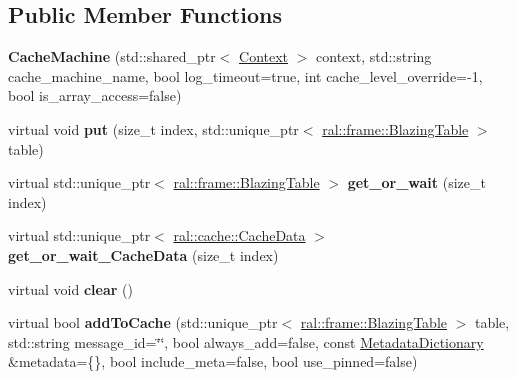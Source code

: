 \subsection*{Public Member Functions}
\begin{DoxyCompactItemize}
\item 
\mbox{\label{classral_1_1cache_1_1CacheMachine_a56079d9ace98b5755643a9f9d6f05e88}} 
{\bfseries Cache\+Machine} (std\+::shared\+\_\+ptr$<$ \hyperlink{classblazingdb_1_1manager_1_1Context}{Context} $>$ context, std\+::string cache\+\_\+machine\+\_\+name, bool log\+\_\+timeout=true, int cache\+\_\+level\+\_\+override=-\/1, bool is\+\_\+array\+\_\+access=false)
\item 
\mbox{\label{classral_1_1cache_1_1CacheMachine_a27088fefa2a1edcf5729e2df01043d49}} 
virtual void {\bfseries put} (size\+\_\+t index, std\+::unique\+\_\+ptr$<$ \hyperlink{classral_1_1frame_1_1BlazingTable}{ral\+::frame\+::\+Blazing\+Table} $>$ table)
\item 
\mbox{\label{classral_1_1cache_1_1CacheMachine_aaaef8954262a3745d30087550120fe6f}} 
virtual std\+::unique\+\_\+ptr$<$ \hyperlink{classral_1_1frame_1_1BlazingTable}{ral\+::frame\+::\+Blazing\+Table} $>$ {\bfseries get\+\_\+or\+\_\+wait} (size\+\_\+t index)
\item 
\mbox{\label{classral_1_1cache_1_1CacheMachine_ab6b8f6d16284a9fe0ced6fe8c22be4f0}} 
virtual std\+::unique\+\_\+ptr$<$ \hyperlink{classral_1_1cache_1_1CacheData}{ral\+::cache\+::\+Cache\+Data} $>$ {\bfseries get\+\_\+or\+\_\+wait\+\_\+\+Cache\+Data} (size\+\_\+t index)
\item 
\mbox{\label{classral_1_1cache_1_1CacheMachine_ac8279867d62662b93eb1649257e943a4}} 
virtual void {\bfseries clear} ()
\item 
\mbox{\label{classral_1_1cache_1_1CacheMachine_a85a26fe9c3ea4139fce1f6cd0fc6513c}} 
virtual bool {\bfseries add\+To\+Cache} (std\+::unique\+\_\+ptr$<$ \hyperlink{classral_1_1frame_1_1BlazingTable}{ral\+::frame\+::\+Blazing\+Table} $>$ table, std\+::string message\+\_\+id=\char`\"{}\char`\"{}, bool always\+\_\+add=false, const \hyperlink{classral_1_1cache_1_1MetadataDictionary}{Metadata\+Dictionary} \&metadata=\{\}, bool include\+\_\+meta=false, bool use\+\_\+pinned=false)

\end{DoxyCompactItemize}
